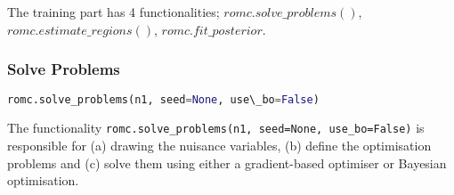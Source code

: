 The training part has 4 functionalities; $romc.solve\_problems()$, $romc.estimate\_regions()$, $romc.fit\_posterior$.

\subsubsection*{Solve Problems}

\begin{lstlisting}[language=Python]
  romc.solve_problems(n1, seed=None, use\_bo=False)
\end{lstlisting}

\noindent
The functionality \lstinline{romc.solve_problems(n1, seed=None, use_bo=False)} is responsible for (a) drawing the nuisance variables, (b) define the optimisation problems and (c) solve them using either a gradient-based optimiser or Bayesian optimisation.

